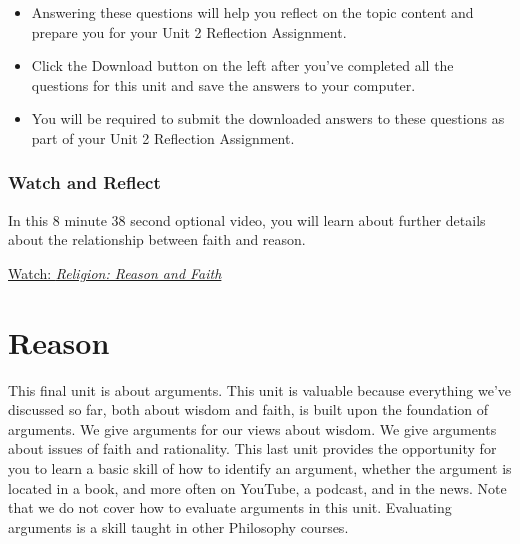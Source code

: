 \documentclass[
]{book}
\providecommand{\tightlist}{%
  \setlength{\itemsep}{0pt}\setlength{\parskip}{0pt}}
\begin{document}
\begin{reflect}
\begin{itemize}
\tightlist
\item
  Answering these questions will help you reflect on the topic content and prepare you for your Unit 2 Reflection Assignment.
\item
  Click the Download button on the left after you've completed all the questions for this unit and save the answers to your computer.
\item
  You will be required to submit the downloaded answers to these questions as part of your Unit 2 Reflection Assignment.
\end{itemize}
\end{reflect}

\hypertarget{watch-and-reflect-15}{%
\subsection*{Watch and Reflect}\label{watch-and-reflect-15}}

\begin{reflect}
In this 8 minute 38 second optional video, you will learn about further details about the relationship between faith and reason.

\href{https://www.youtube.com/watch?v=MTPHXNMi9tA}{Watch: \emph{Religion: Reason and Faith}}
\end{reflect}

\hypertarget{reason}{%
\chapter{Reason}\label{reason}}

This final unit is about arguments. This unit is valuable because everything we've discussed so far, both about wisdom and faith, is built upon the foundation of arguments. We give arguments for our views about wisdom. We give arguments about issues of faith and rationality. This last unit provides the opportunity for you to learn a basic skill of how to identify an argument, whether the argument is located in a book, and more often on YouTube, a podcast, and in the news. Note that we do not cover how to evaluate arguments in this unit. Evaluating arguments is a skill taught in other Philosophy courses.
\end{document}
